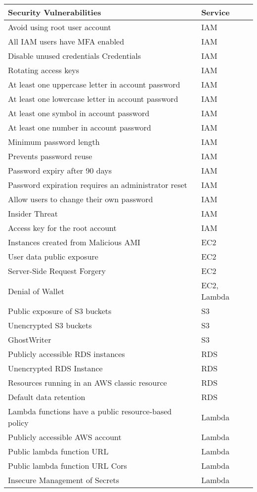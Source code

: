 \begin{longtable}{|p{12cm}|p{2.4cm}|}
    \hline
    \textbf{Security Vulnerabilities} & \textbf{Service} \\
    \hline
    Avoid using root user account & IAM \\
    \hline
    All IAM users have MFA enabled & IAM  \\
    \hline
    Disable unused credentials Credentials & IAM  \\
    \hline
    Rotating access keys & IAM  \\
    \hline
    At least one uppercase letter in account password & IAM
    \\
    \hline
    At least one lowercase letter  in account password &
    IAM  \\
    \hline
    At least one symbol  in account password & IAM \\
    \hline
    At least one number  in account password & IAM \\
    \hline
    Minimum password length & IAM \\
    \hline
    Prevents password reuse & IAM \\
    \hline
    Password expiry after 90 days & IAM \\
    \hline
    Password expiration requires an administrator reset & IAM \\
    \hline
    Allow users to change their own password & IAM \\
    \hline
    Insider Threat & IAM \\
    \hline
    Access key for the root account & IAM \\
    \hline
    Instances created from Malicious AMI & EC2 \\
    \hline
    User data public exposure & EC2 \\
    \hline
    Server-Side Request Forgery & EC2 \\
    \hline
    Denial of Wallet & EC2, Lambda \\
    \hline
    Public exposure of S3 buckets & S3 \\
    \hline
    Unencrypted S3 buckets & S3 \\
    \hline
    GhostWriter & S3  \\
    \hline
    Publicly accessible RDS instances & RDS \\
    \hline
    Unencrypted RDS Instance & RDS \\
    \hline
    Resources running in an AWS classic resource & RDS \\
    \hline
    Default data retention & RDS \\
    \hline
    Lambda functions have a public resource-based policy & Lambda \\
    \hline
    Publicly accessible AWS account & Lambda \\
    \hline
    Public lambda function URL & Lambda \\
    \hline
    Public lambda function URL Cors & Lambda \\
    \hline
    Insecure Management of Secrets & Lambda \\
    \hline


\end{longtable}
